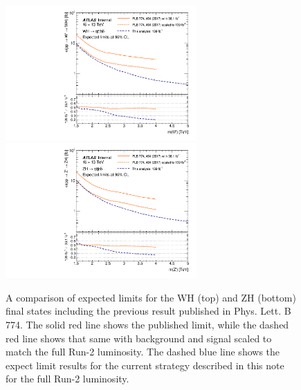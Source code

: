 \begin{figure}[htbp!]
    \begin{center}
        \includegraphics[width=0.65\textwidth]{VHqqbbLimit_WH_2016_2019_v4.pdf} \\
        \includegraphics[width=0.65\textwidth]{VHqqbbLimit_ZH_2016_2019_v4.pdf}
    \end{center}
    \caption{
        A comparison of expected limits for the WH (top) and ZH (bottom) final states including the previous result published in Phys. Lett. B 774.
        The solid red line shows the published limit, while the dashed red line shows that same with background and signal scaled to match the full Run-2 luminosity.
        The dashed blue line shows the expect limit results for the current strategy described in this note for the full Run-2 luminosity.
    }
    \label{fig:exp_limit_cmp}
\end{figure}

